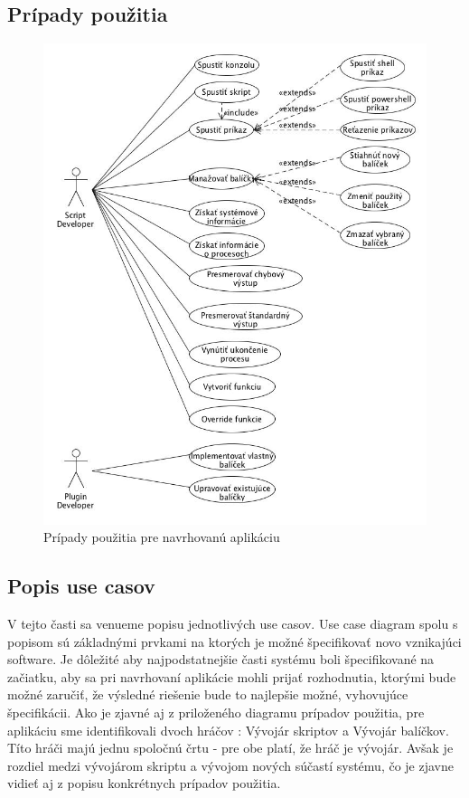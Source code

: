 \subsection{Prípady použitia}
\indent 
\begin{figure}[!htbp]
	\centering
	\includegraphics[scale=0.7]{img/usecase.jpg}
	\caption{Prípady použitia pre navrhovanú aplikáciu}
	\label{fig:test}
\end{figure}
\newpage
\subsection{Popis use casov}
\indent V tejto časti sa venueme popisu jednotlivých use casov. Use case diagram spolu s popisom sú základnými prvkami na ktorých je možné špecifikovať novo vznikajúci software. Je dôležité aby najpodstatnejšie časti systému boli špecifikované na začiatku, aby sa pri navrhovaní aplikácie mohli prijať rozhodnutia, ktorými bude možné zaručiť, že výsledné riešenie bude to najlepšie možné, vyhovujúce špecifikácii. Ako je zjavné aj z priloženého diagramu prípadov použitia, pre aplikáciu sme identifikovali dvoch hráčov : Vývojár skriptov a Vývojár balíčkov. Títo hráči majú jednu spoločnú črtu - pre obe platí, že hráč je vývojár. Avšak je rozdiel medzi vývojárom skriptu a vývojom nových súčastí systému, čo je zjavne vidieť aj z popisu konkrétnych prípadov použitia.
